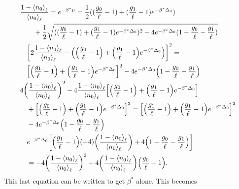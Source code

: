 \begin{align}
    &\frac{1-\left<{n_0}\right>_\ell}{\left<{n_0}\right>_\ell}=e^{-\beta^*\mu }=\frac{1}{2}((\frac{g_0}{\ell}-1)+(\frac{g_1}{\ell}-1)e^{-\beta^*\Delta_0})\\
    &\quad\quad +\frac{1}{2}\sqrt{((\frac{g_0}{\ell}-1)+(\frac{g_1}{\ell}-1)e^{-\beta^*\Delta_0})^2-4e^{-\beta^*\Delta_0}(1-\frac{g_0}{\ell}-\frac{g_1}{\ell})} \nonumber\\
    &\quad\qty[2\frac{1-\left<{n_0}\right>_\ell}{\left<{n_0}\right>_\ell}-\qty(\qty(\frac{g_0}{\ell}-1)+\qty(\frac{g_1}{\ell}-1)e^{-\beta^*\Delta_0})]^2=\nonumber\\
    &\quad\qty[\qty(\frac{g_1}{\ell}-1)+\qty(\frac{g_1}{\ell}-1)e^{-\beta^*\Delta_0}]^2-4e^{-\beta^*\Delta_0} \qty(1-\frac{g_0}{\ell}-\frac{g_1}{\ell})\\
    &4\qty(\frac{1-\left<{n_0}\right>_\ell}{\left<{n_0}\right>_\ell})^2-4 \frac{1-\left<{n_0}\right>_\ell}{\left<{n_0}\right>_\ell} \qty[\qty(\frac{g_0}{\ell}-1)+\qty(\frac{g_1}{\ell}-1)e^{-\beta^*\Delta_0}]\nonumber\\
    &\quad+\qty[\qty(\frac{g_0}{\ell}-1)+\qty(\frac{g_1}{\ell}-1)e^{-\beta^*\Delta_0}]^2= \qty[\qty(\frac{g_1}{\ell}-1)+\qty(\frac{g_1}{\ell}-1)e^{-\beta^*\Delta_0}]^2\nonumber\\
    &\quad -4e^{-\beta^*\Delta_0} \qty(1-\frac{g_0}{\ell}-\frac{g_1}{\ell})\nonumber\\
    &\quad e^{-\beta^*\Delta_0}\qty[\qty(\frac{g_1}{\ell}-1)(-4)\qty(\frac{1-\left<{n_0}\right>_\ell}{\left<{n_0}\right>_\ell})+4\qty(1-\frac{g_0}{\ell}-\frac{g_1}{\ell})]\nonumber\\
    &\quad =-4\qty(\frac{1-\left<{n_0}\right>_\ell}{\left<{n_0}\right>_\ell})^2+4\qty(\frac{1-\left<{n_0}\right>_\ell}{\left<{n_0}\right>_\ell})\qty(\frac{g_0}{\ell}-1).
\end{align}
This last equation can be written to get $\beta^*$ alone. This becomes 
